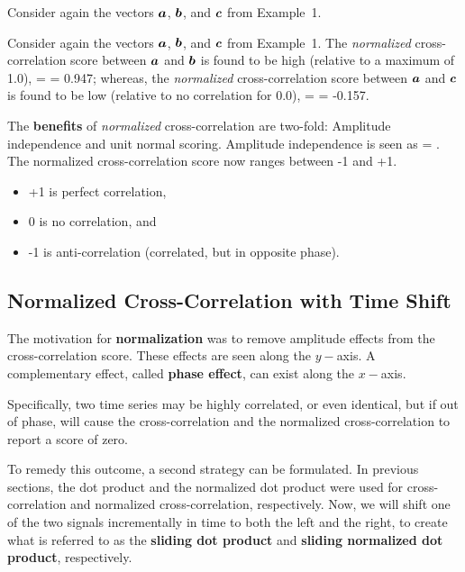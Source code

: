 Consider again the vectors $\mbox{\boldmath $a$}$, $\mbox{\boldmath $b$}$, and $\mbox{\boldmath $c$}$ from 
Example~1.

\begin{Hexample}
	{
    Consider again the vectors $\mbox{\boldmath $a$}$, $\mbox{\boldmath $b$}$, and $\mbox{\boldmath $c$}$ from 
    Example~1.
	The {\em normalized} cross-correlation score between $\mbox{\boldmath $a$}$ and $\mbox{\boldmath $b$}$ is found to be 
	high (relative to a maximum of 1.0), 
	\be
    \frac{\va}{\parallel \va \parallel} \cdot 
    \frac{\vb}{\parallel \vb \parallel} =  
    = 0.947;
	\ee
    whereas, the {\em normalized} cross-correlation score between $\mbox{\boldmath $a$}$ and $\mbox{\boldmath $c$}$ 
    is found to 
	be low (relative to no correlation for 0.0), 
	\be
    \frac{\va}{\parallel \va \parallel}
    \cdot 
    \frac{\vc}{\parallel \vc \parallel} =  = -0.157.
	\ee
	}
\end{Hexample}

The {\bf benefits} of {\em normalized} cross-correlation are two-fold:  
Amplitude independence and unit normal scoring.  Amplitude independence 
is seen as 
\be
\va \cdot \va = \va \cdot {}.
\ee
The normalized cross-correlation score now ranges between -1 and +1.
\begin{itemize}
 \item +1 is perfect correlation,
 \item 0 is no correlation, and
 \item -1 is anti-correlation (correlated, but in opposite phase).
\end{itemize}

\subsection{Normalized Cross-Correlation with Time Shift}
The motivation for {\bf normalization} was to remove amplitude effects 
from the cross-correlation score.  These effects are seen along the
$y-$axis.  A complementary effect, called {\bf phase effect}, can 
exist along the $x-$axis. 

Specifically, two time series may be highly correlated, or even
identical, but if out of phase, will cause the cross-correlation and 
the normalized cross-correlation to report a score of zero. 

To remedy this outcome, a second strategy can be formulated.  
In previous sections, 
the dot product and the normalized dot product were used for 
cross-correlation and normalized cross-correlation, respectively.
Now, we will shift one of the two signals incrementally in time to 
both the left and the right, to create what is referred to as the
{\bf sliding dot product} and 
{\bf sliding normalized dot product}, 
respectively.

